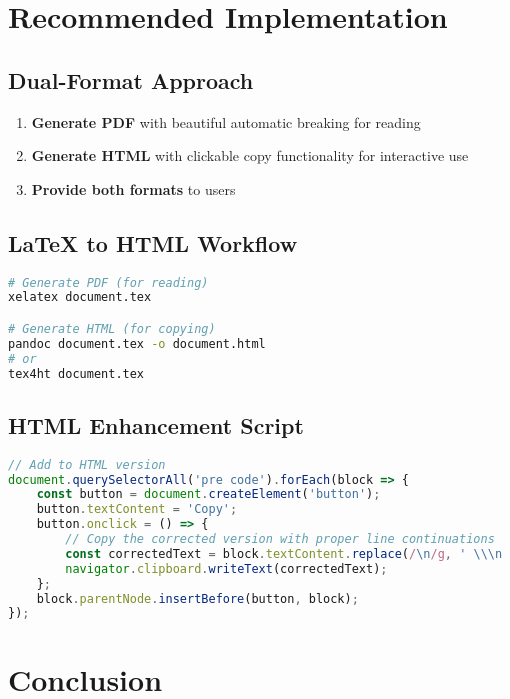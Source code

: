 \documentclass{article}
\begin{document}
\section{Recommended Implementation}

\subsection{Dual-Format Approach}

\begin{enumerate}
    \item \textbf{Generate PDF} with beautiful automatic breaking for reading
    \item \textbf{Generate HTML} with clickable copy functionality for interactive use
    \item \textbf{Provide both formats} to users
\end{enumerate}

\subsection{LaTeX to HTML Workflow}

\begin{lstlisting}[language=bash]
# Generate PDF (for reading)
xelatex document.tex

# Generate HTML (for copying)
pandoc document.tex -o document.html
# or
tex4ht document.tex
\end{lstlisting}

\subsection{HTML Enhancement Script}

\begin{lstlisting}[language=javascript]
// Add to HTML version
document.querySelectorAll('pre code').forEach(block => {
    const button = document.createElement('button');
    button.textContent = 'Copy';
    button.onclick = () => {
        // Copy the corrected version with proper line continuations
        const correctedText = block.textContent.replace(/\n/g, ' \\\n  ');
        navigator.clipboard.writeText(correctedText);
    };
    block.parentNode.insertBefore(button, block);
});
\end{lstlisting}

\section{Conclusion}
\end{document}
